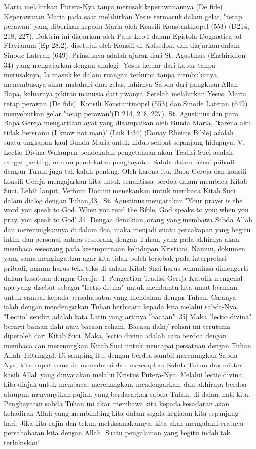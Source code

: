 Maria melahirkan Putera-Nya tanpa merusak keperawanannya (De fide)
Keperawanan Maria pada saat melahirkan Yesus termasuk dalam gelar, "tetap perawan" yang diberikan kepada Maria oleh Konsili Konstantinopel (553) (D214, 218, 227). Doktrin ini diajarkan oleh Paus Leo I dalam Epistola Dogmatica ad Flavianum (Ep 28,2), disetujui oleh Konsili di Kalsedon, dan diajarkan dalam Sinode Lateran (649). Prinsipnya adalah ajaran dari St. Agustinus (Enchiridion 34) yang mengajarkan dengan analogi- Yesus keluar dari kubur tanpa merusaknya, Ia masuk ke dalam ruangan terkunci tanpa membukanya, menembusnya sinar matahari dari gelas, lahirnya Sabda dari pangkuan Allah Bapa, keluarnya pikiran manusia dari jiwanya.
Setelah melahirkan Yesus, Maria tetap perawan (De fide).
Konsili Konstantinopel (553) dan Sinode Lateran (649) menyebutkan gelar "tetap perawan"(D 214, 218, 227). St. Agustinus dan para Bapa Gereja mengartikan ayat yang disampaikan oleh Bunda Maria, "karena aku tidak bersuami (I know not man)" (Luk 1:34) (Douay Rheims Bible) adalah suatu ungkapan kaul Bunda Maria untuk hidup selibat sepanjang hidupnya.
V. Lectio Divina
Walaupun pendekatan pengetahuan akan Tradisi Suci adalah sangat penting, namun pendekatan penghayatan Sabda dalam relasi pribadi dengan Tuhan juga tak kalah penting. Oleh karena itu, Bapa Gereja dan konsili-konsili Gereja mengajarkan kita untuk senantiasa berdoa dalam membaca Kitab Suci. Lebih lanjut, Verbum Domini menekankan untuk membaca Kitab Suci dalam dialog dengan Tuhan[33]. St. Agustinus mengatakan "Your prayer is the word you speak to God. When you read the Bible, God speaks to you; when you pray, you speak to God"[34] Dengan demikian, orang yang membawa Sabda Allah dan merenungkannya di dalam doa, maka menjadi suatu percakapan yang begitu intim dan personal antara seseorang dengan Tuhan, yang pada akhirnya akan membaca seseorang pada kesempurnaan kehidupan Kristiani. Namun, dokumen yang sama mengingatkan agar kita tidak boleh terjebak pada interpretasi pribadi, namun harus teks-teks di dalam Kitab Suci harus senantiasa dimengerti dalam kesatuan dengan Gereja.
1. Pengertian
Tradisi Gereja Katolik mengenal apa yang disebut sebagai "lectio divina" untuk membantu kita umat beriman untuk sampai kepada persahabatan yang mendalam dengan Tuhan. Caranya ialah dengan mendengarkan Tuhan berbicara kepada kita melalui sabda-Nya. "Lectio" sendiri adalah kata Latin yang artinya "bacaan".[35] Maka "lectio divina" berarti bacaan ilahi atau bacaan rohani. Bacaan ilahi/ rohani ini terutama diperoleh dari Kitab Suci. Maka, lectio divina adalah cara berdoa dengan membaca dan merenungkan Kitab Suci untuk mencapai persatuan dengan Tuhan Allah Tritunggal. Di samping itu, dengan berdoa sambil merenungkan Sabda-Nya, kita dapat semakin memahami dan meresapkan Sabda Tuhan dan misteri kasih Allah yang dinyatakan melalui Kristus Putera-Nya. Melalui lectio divina, kita diajak untuk membaca, merenungkan, mendengarkan, dan akhirnya berdoa ataupun menyanyikan pujian yang berdasarkan sabda Tuhan, di dalam hati kita. Penghayatan sabda Tuhan ini akan membawa kita kepada kesadaran akan kehadiran Allah yang membimbing kita dalam segala kegiatan kita sepanjang hari. Jika kita rajin dan tekun melaksanakannya, kita akan mengalami eratnya persahabatan kita dengan Allah. Suatu pengalaman yang begitu indah tak terlukiskan!
